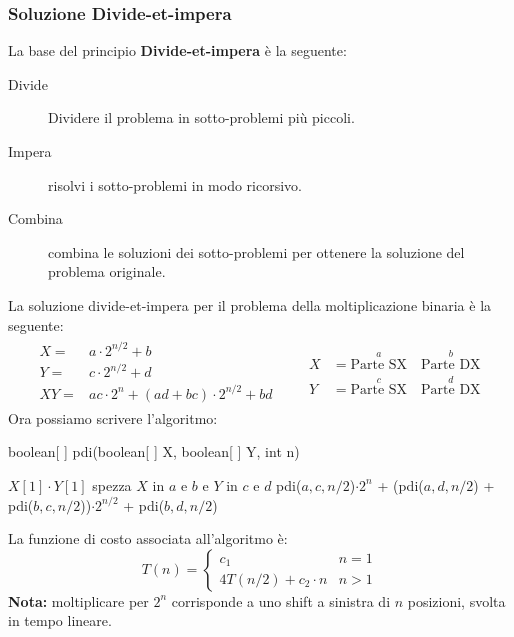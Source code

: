         \subsubsection{Soluzione Divide-et-impera}
            La base del principio \textbf{Divide-et-impera} è la seguente:
            \begin{description}
                \item[Divide] Dividere il problema in sotto-problemi più piccoli.
                \item[Impera] risolvi i sotto-problemi in modo ricorsivo.
                \item[Combina] combina le soluzioni dei sotto-problemi per ottenere la soluzione del problema originale.  
            \end{description}
            La soluzione divide-et-impera per il problema della moltiplicazione binaria è la seguente:
            $$
                \begin{aligned}
                    \begin{aligned}
                        X=& a\cdot 2^{n/2} + b\\
                        Y=& c\cdot 2^{n/2} + d\\
                        XY =& ac\cdot 2^n + (ad+bc)\cdot 2^{n/2} + bd
                    \end{aligned}
                    &\quad
                    \begin{aligned}
                        X &= \stackrel{a}{\text{Parte SX}}\quad \stackrel{b}{\text{Parte DX}}\\
                        Y &= \stackrel{c}{\text{Parte SX}}\quad \stackrel{d}{\text{Parte DX}}
                    \end{aligned}
                \end{aligned}
            $$
            Ora possiamo scrivere l'algoritmo:
            \begin{algorithm}
                \caption{boolean[ ] pdi(boolean[ ] X, boolean[ ] Y, int n)}\label{alg:pdi}
                \begin{algorithmic}[1]
                        \State \Return $X[1]\cdot Y[1]$
                    \Else
                        \State spezza $X$ in $a$ e $b$ e $Y$ in $c$ e $d$
                        \State \Return pdi($a,c,n/2$)$\cdot 2^n$ + (pdi($a,d,n/2$) + pdi($b,c,n/2$))$\cdot 2^{n/2}$ + pdi($b,d,n/2$)
                    \EndIf
                \end{algorithmic}
            \end{algorithm}
            La funzione di costo associata all'algoritmo è:
            $$
                T(n)=\begin{cases}
                    c_1 & n=1\\
                    4T(n/2)+c_2\cdot n &  n>1
                \end{cases}
            $$
            \textbf{Nota:} moltiplicare per $2^n$ corrisponde a uno shift a sinistra di $n$ posizioni, svolta in tempo lineare.

